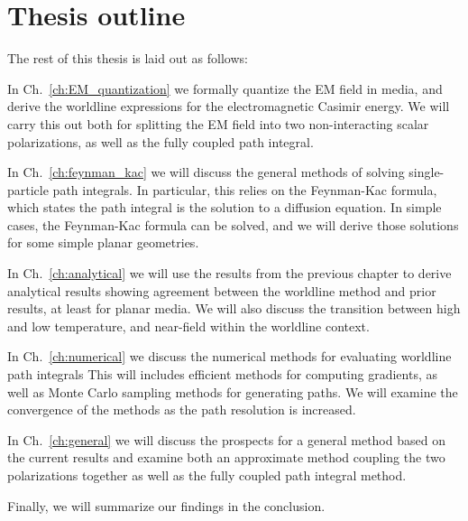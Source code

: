 \section{Thesis outline}

The rest of this thesis is laid out as follows: 

In Ch.~\ref{ch:EM_quantization} we formally quantize
the EM field in media, and derive the worldline expressions for the electromagnetic Casimir energy.
We will carry this out both for splitting the EM field into two non-interacting scalar polarizations,
as well as the fully coupled path integral.

In Ch.~\ref{ch:feynman_kac} we will discuss the general methods of solving single-particle path 
integrals.  In particular, this relies on the Feynman-Kac formula, which states the path integral
 is the solution to a diffusion equation.  In simple cases, the Feynman-Kac formula can be solved,
and we will derive those solutions for some simple planar geometries. 

In Ch.~\ref{ch:analytical} we will use the results from the previous chapter to derive analytical 
results showing agreement between the worldline method and prior results, at least for planar media.
We will also discuss the transition between high and low temperature, and near-field within the
worldline context.  

In Ch.~\ref{ch:numerical} we discuss the numerical methods for evaluating worldline path integrals
This will includes efficient methods for computing gradients, as well as Monte Carlo sampling methods
for generating paths.  We will examine the convergence of the methods as the path resolution is increased.

In Ch.~\ref{ch:general} we will discuss the prospects for a general method based on the current
results and examine both an approximate method coupling the two polarizations together as well
as the fully coupled path integral method.  %

Finally, we will summarize our findings in the conclusion.  

